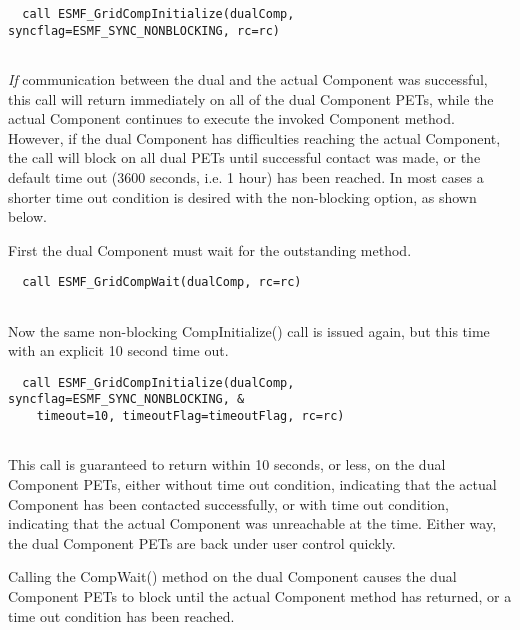  \begin{verbatim}
  call ESMF_GridCompInitialize(dualComp, syncflag=ESMF_SYNC_NONBLOCKING, rc=rc)
 
\end{verbatim}
 

  
   {\em If} communication between the dual and the actual Component was successful, 
   this call will return immediately on all of the dual Component PETs, while the
   actual Component continues to execute the invoked Component method.
   However, if the dual Component has difficulties reaching the actual Component,
   the call will block on all dual PETs until successful contact was made, or the
   default time out (3600 seconds, i.e. 1 hour) has been reached. In most cases a 
   shorter time out condition is desired with the non-blocking option, as shown
   below.
  
   First the dual Component must wait for the outstanding method. 

 \begin{verbatim}
  call ESMF_GridCompWait(dualComp, rc=rc)
 
\end{verbatim}
 

  
   Now the same non-blocking CompInitialize() call is issued again, but this time
   with an explicit 10 second time out. 

 \begin{verbatim}
  call ESMF_GridCompInitialize(dualComp, syncflag=ESMF_SYNC_NONBLOCKING, &
    timeout=10, timeoutFlag=timeoutFlag, rc=rc)
 
\end{verbatim}
 

  
   This call is guaranteed to return within 10 seconds, or less, on the dual Component
   PETs, either without time out condition, indicating that the actual Component
   has been contacted successfully, or with time out condition, indicating that
   the actual Component was unreachable at the time. Either way, the dual 
   Component PETs are back under user control quickly.
  
   Calling the CompWait() method on the dual Component causes the dual Component
   PETs to block until the actual Component method has returned, or a time out
   condition has been reached. 

